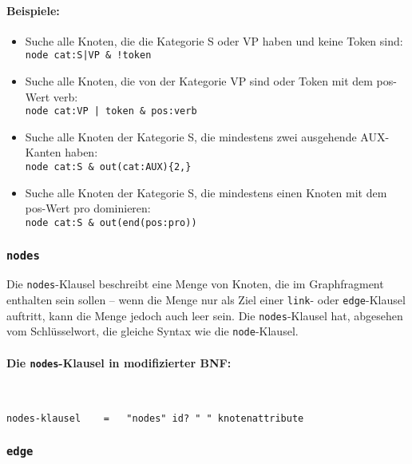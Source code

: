\documentclass[12pt]{scrartcl}
\begin{document}
\paragraph*{Beispiele:}
\begin{itemize}
	\item Suche alle Knoten, die die Kategorie S oder VP haben und keine Token sind:\\
	{\tt node cat:S|VP \& !token}
	\item Suche alle Knoten, die von der Kategorie VP sind oder Token mit dem pos-Wert verb:\\
	{\tt node cat:VP | token \& pos:verb}
	\item Suche alle Knoten der Kategorie S, die mindestens zwei ausgehende AUX-Kanten haben:\\
	{\tt node cat:S \& out(cat:AUX)\{2,\}}
	\item Suche alle Knoten der Kategorie S, die mindestens einen Knoten mit dem pos-Wert pro dominieren:\\
	{\tt node cat:S \& out(end(pos:pro))}
\end{itemize}



\subsubsection{\texttt{nodes}}

Die \texttt{nodes}-Klausel beschreibt eine Menge von Knoten, die im Graphfragment enthalten sein sollen – wenn die Menge nur als Ziel einer \texttt{link}- oder \texttt{edge}-Klausel auftritt, kann die Menge jedoch auch leer sein. Die \texttt{nodes}-Klausel hat, abgesehen vom Schlüsselwort,  die gleiche Syntax wie die \texttt{node}-Klausel.

\paragraph*{Die \texttt{nodes}-Klausel in modifizierter BNF:}
~
\begin{framed}
\begin{lstlisting}
nodes-klausel    =   "nodes" id? " " knotenattribute
\end{lstlisting}
\end{framed}






\subsubsection{\texttt{edge}}\label{edge}
\end{document}
